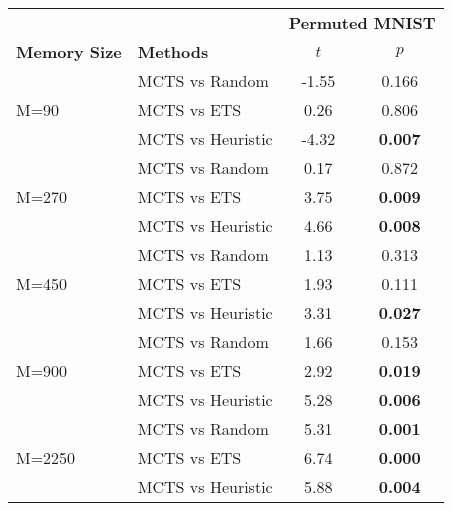 \begin{tabular}{llcc}
\toprule
                        &                  & \multicolumn{2}{c}{\textbf{Permuted MNIST}} \\
\cmidrule(lr){3-4}
\textbf{Memory Size}    & \textbf{Methods} & $t$                  & $p$                    \\
\midrule
\multirow{3}{*}{M=90}   & MCTS vs Random   & -1.55             & 0.166            \\
                        & MCTS vs ETS      & 0.26              & 0.806            \\
                        & MCTS vs Heuristic  & -4.32             & \textbf{0.007}            \\
\midrule
\multirow{3}{*}{M=270}  & MCTS vs Random   & 0.17              & 0.872            \\
                        & MCTS vs ETS      & 3.75              & \textbf{0.009}            \\
                        & MCTS vs Heuristic  & 4.66              & \textbf{0.008}            \\
\midrule
\multirow{3}{*}{M=450}  & MCTS vs Random   & 1.13              & 0.313            \\
                        & MCTS vs ETS      & 1.93              & 0.111            \\
                        & MCTS vs Heuristic  & 3.31              & \textbf{0.027}            \\
\midrule
\multirow{3}{*}{M=900}  & MCTS vs Random   & 1.66              & 0.153            \\
                        & MCTS vs ETS      & 2.92              & \textbf{0.019}            \\
                        & MCTS vs Heuristic  & 5.28              & \textbf{0.006}            \\
\midrule
\multirow{3}{*}{M=2250} & MCTS vs Random   & 5.31              & \textbf{0.001}            \\
                        & MCTS vs ETS      & 6.74              & \textbf{0.000}            \\
                        & MCTS vs Heuristic  & 5.88              & \textbf{0.004}    \\
\bottomrule
\end{tabular}